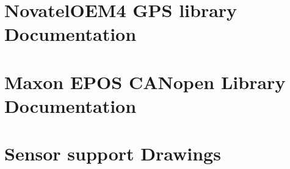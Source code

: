 \setcounter{page}{1}
\chapter{NovatelOEM4 GPS library Documentation}
\cleardoublepage
\pagestyle{empty}
\newlength{\originalVOffset}
\newlength{\originalHOffset}
\setlength{\originalVOffset}{\voffset}   
\setlength{\originalHOffset}{\hoffset}

\setlength{\voffset}{0cm}
\setlength{\hoffset}{0cm}
\label{appendix:novatel}

\cleardoublepage


\setcounter{page}{1}
\setlength{\voffset}{\originalVOffset}
\setlength{\hoffset}{\originalHOffset}
\chapter{Maxon EPOS CANopen Library Documentation}
\cleardoublepage
\setlength{\voffset}{0cm}
\setlength{\hoffset}{0cm}
\label{appendix:maxon}

\setlength{\voffset}{\originalVOffset}
\setlength{\hoffset}{\originalHOffset}
\cleardoublepage

\setcounter{page}{1}
\pagestyle{plain}
\setlength{\voffset}{\originalVOffset}
\setlength{\hoffset}{\originalHOffset}
\chapter{Sensor support Drawings}
\label{appendix:sensor_drawings}
\pagebreak

%


